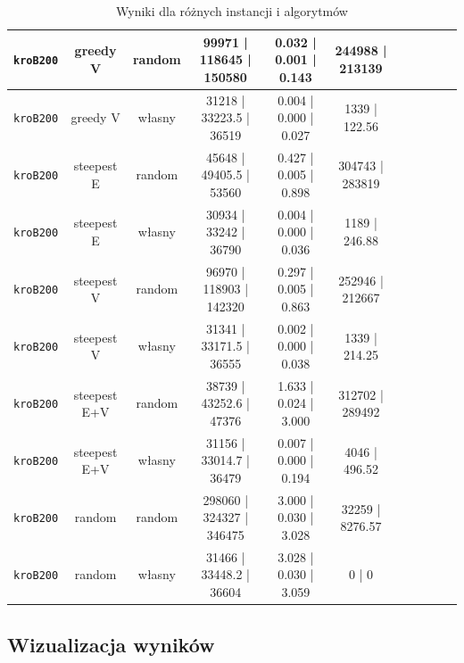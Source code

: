 \documentclass[11pt]{article}
\begin{document}
\begin{table}[ht]
\begin{tabular}{|c|c|c||c|c|c||c|c|c||c|c|}
\texttt{kroB200} & greedy V & random & 99971 | 118645 | 150580 & 0.032 | 0.001 | 0.143 & 244988 | 213139 \\ \hline
\texttt{kroB200} & greedy V & własny & 31218 | 33223.5 | 36519 & 0.004 | 0.000 | 0.027 & 1339 | 122.56 \\ \hline
\texttt{kroB200} & steepest E & random & 45648 | 49405.5 | 53560 & 0.427 | 0.005 | 0.898 & 304743 | 283819 \\ \hline
\texttt{kroB200} & steepest E & własny & 30934 | 33242 | 36790 & 0.004 | 0.000 | 0.036 & 1189 | 246.88 \\ \hline
\texttt{kroB200} & steepest V & random & 96970 | 118903 | 142320 & 0.297 | 0.005 | 0.863 & 252946 | 212667 \\ \hline
\texttt{kroB200} & steepest V & własny & 31341 | 33171.5 | 36555 & 0.002 | 0.000 | 0.038 & 1339 | 214.25 \\ \hline
\texttt{kroB200} & steepest E+V & random & 38739 | 43252.6 | 47376 & 1.633 | 0.024 | 3.000 & 312702 | 289492 \\ \hline
\texttt{kroB200} & steepest E+V & własny & 31156 | 33014.7 | 36479 & 0.007 | 0.000 | 0.194 & 4046 | 496.52 \\ \hline
\texttt{kroB200} & random & random & 298060 | 324327 | 346475 & 3.000 | 0.030 | 3.028 & 32259 | 8276.57 \\ \hline
\texttt{kroB200} & random & własny & 31466 | 33448.2 | 36604 & 3.028 | 0.030 | 3.059 & 0 | 0 \\ \hline
\end{tabular}
\caption{Wyniki dla różnych instancji i algorytmów}
\end{table}


\subsection{Wizualizacja wyników}
\end{document}
